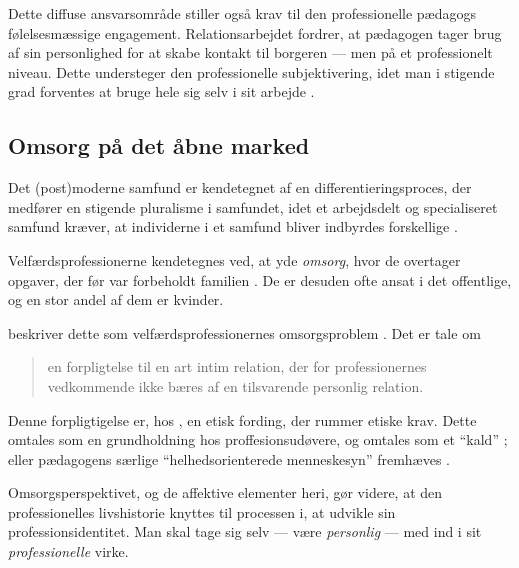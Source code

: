 Dette diffuse ansvarsområde stiller også krav til den professionelle pædagogs følelsesmæssige engagement. Relationsarbejdet fordrer, at pædagogen tager brug af sin personlighed for at skabe kontakt til borgeren — men på et professionelt niveau. Dette understeger den professionelle subjektivering, idet man i stigende grad forventes at bruge hele sig selv i sit arbejde \autocite[s. 71f]{mik-meyerIndledningSkabeProfessionel2012}.

\subsection{Omsorg på det åbne marked}
Det (post)moderne samfund er kendetegnet af en differentieringsproces, der medfører en stigende pluralisme i samfundet, idet et arbejdsdelt og specialiseret samfund kræver, at individerne i et samfund bliver indbyrdes forskellige \autocite[s. 32f]{hansbolKonstruktionAfProfessionel2008}.

Velfærdsprofessionerne kendetegnes ved, at yde \textit{omsorg}, hvor de overtager opgaver, der før var forbeholdt familien \autocite[s. 445]{frederiksenVelfaerdsprofessionerMellemOmsorg2017}.
De er desuden ofte ansat i det offentlige, og en stor andel af dem er kvinder.

\citeauthor{frederiksenVelfaerdsprofessionerMellemOmsorg2017} beskriver dette som velfærdsprofessionernes omsorgsproblem \autocite[s.455ff]{frederiksenVelfaerdsprofessionerMellemOmsorg2017}.
Det er tale om
\begin{quote}
  \lodts en forpligtelse til en art intim relation, der for professionernes vedkommende ikke bæres af en tilsvarende personlig relation. \autocite[s. 456]{frederiksenVelfaerdsprofessionerMellemOmsorg2017}
\end{quote}

Denne forpligtigelse er, hos \citeauthor{frederiksenVelfaerdsprofessionerMellemOmsorg2017}, en etisk fording, der rummer etiske krav.
Dette omtales som en grundholdning hos proffesionsudøvere, og omtales som et “kald” \autocite[s. 457]{frederiksenVelfaerdsprofessionerMellemOmsorg2017}; eller pædagogens særlige “helhedsorienterede menneskesyn” fremhæves \autocite{socialpaedagogerneSocialpaedagogiskeKernefaglighed2015}. 

Omsorgsperspektivet, og de affektive elementer heri, gør videre, at den professionelles livshistorie knyttes til processen i, at udvikle sin professionsidentitet.
Man skal tage sig selv — være \textit{personlig} — med ind i sit \textit{professionelle} virke.
\autocite[s. 457f]{frederiksenVelfaerdsprofessionerMellemOmsorg2017}

